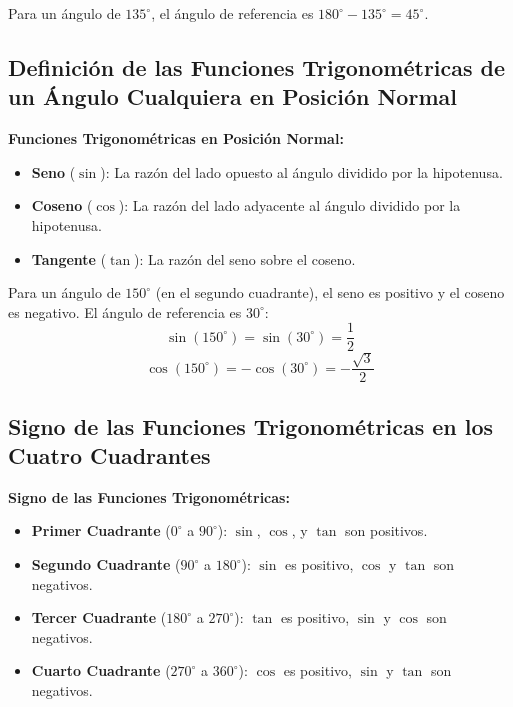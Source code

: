 \begin{example}
    Para un ángulo de \(135^\circ\), el ángulo de referencia es \(180^\circ - 135^\circ = 45^\circ\).
\end{example}

\subsection{Definición de las Funciones Trigonométricas de un Ángulo Cualquiera en Posición Normal}

\begin{definition}
    \textbf{Funciones Trigonométricas en Posición Normal:} 
    \begin{itemize}
        \item \textbf{Seno} (\(\sin\)): La razón del lado opuesto al ángulo dividido por la hipotenusa.
        \item \textbf{Coseno} (\(\cos\)): La razón del lado adyacente al ángulo dividido por la hipotenusa.
        \item \textbf{Tangente} (\(\tan\)): La razón del seno sobre el coseno.
    \end{itemize}
\end{definition}

\begin{example}
    Para un ángulo de \(150^\circ\) (en el segundo cuadrante), el seno es positivo y el coseno es negativo. El ángulo de referencia es \(30^\circ\):
    \[
    \sin(150^\circ) = \sin(30^\circ) = \frac{1}{2}
    \]
    \[
    \cos(150^\circ) = -\cos(30^\circ) = -\frac{\sqrt{3}}{2}
    \]
\end{example}

\subsection{Signo de las Funciones Trigonométricas en los Cuatro Cuadrantes}

\begin{definition}
    \textbf{Signo de las Funciones Trigonométricas:} 
    \begin{itemize}
        \item \textbf{Primer Cuadrante} (\(0^\circ\) a \(90^\circ\)): \(\sin\), \(\cos\), y \(\tan\) son positivos.
        \item \textbf{Segundo Cuadrante} (\(90^\circ\) a \(180^\circ\)): \(\sin\) es positivo, \(\cos\) y \(\tan\) son negativos.
        \item \textbf{Tercer Cuadrante} (\(180^\circ\) a \(270^\circ\)): \(\tan\) es positivo, \(\sin\) y \(\cos\) son negativos.
        \item \textbf{Cuarto Cuadrante} (\(270^\circ\) a \(360^\circ\)): \(\cos\) es positivo, \(\sin\) y \(\tan\) son negativos.
    \end{itemize}
\end{definition}

